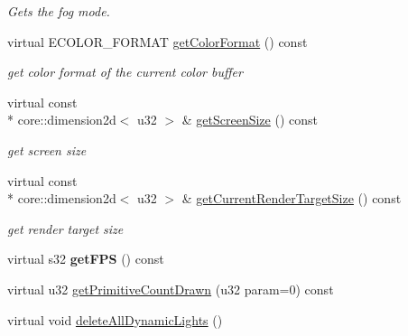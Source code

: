 \begin{DoxyCompactItemize}
\begin{DoxyCompactList}\small\item\em Gets the fog mode. \end{DoxyCompactList}\item 
virtual E\-C\-O\-L\-O\-R\-\_\-\-F\-O\-R\-M\-A\-T \hyperlink{classirr_1_1video_1_1_c_null_driver_a99864bc2ea50adbcab0d3260f348a865}{get\-Color\-Format} () const 
\begin{DoxyCompactList}\small\item\em get color format of the current color buffer \end{DoxyCompactList}\item 
virtual const \\*
core\-::dimension2d$<$ u32 $>$ \& \hyperlink{classirr_1_1video_1_1_c_null_driver_a9adc7fd52b187aa0b41b21e34cf406fb}{get\-Screen\-Size} () const 
\begin{DoxyCompactList}\small\item\em get screen size \end{DoxyCompactList}\item 
virtual const \\*
core\-::dimension2d$<$ u32 $>$ \& \hyperlink{classirr_1_1video_1_1_c_null_driver_ace5c68a16bde7fc2f462f77b17efbbce}{get\-Current\-Render\-Target\-Size} () const 
\begin{DoxyCompactList}\small\item\em get render target size \end{DoxyCompactList}\item 
\hypertarget{classirr_1_1video_1_1_c_null_driver_a381b874bf630133b550e6136d11277ef}{virtual s32 {\bfseries get\-F\-P\-S} () const }\label{classirr_1_1video_1_1_c_null_driver_a381b874bf630133b550e6136d11277ef}

\item 
virtual u32 \hyperlink{classirr_1_1video_1_1_c_null_driver_a20b965f444e97ea16ba2307dbbc24438}{get\-Primitive\-Count\-Drawn} (u32 param=0) const 
\item 
\hypertarget{classirr_1_1video_1_1_c_null_driver_a301347ac240848785c9720b38a564080}{virtual void \hyperlink{classirr_1_1video_1_1_c_null_driver_a301347ac240848785c9720b38a564080}{delete\-All\-Dynamic\-Lights} ()}\label{classirr_1_1video_1_1_c_null_driver_a301347ac240848785c9720b38a564080}


\end{DoxyCompactItemize}
